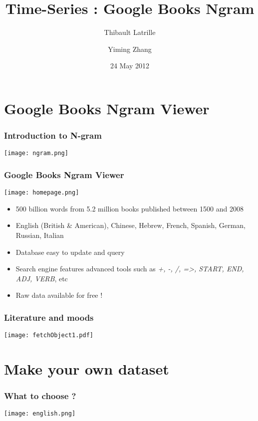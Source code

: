 \documentclass[10pt]{beamer}
\author{ Thibault Latrille \and Yiming Zhang}
\title{Time-Series : Google Books Ngram }
\institute{Uppsala Universitet, Mathematics department}
\date{24 May 2012}
\begin{document}
\lstset{language=Python,tabsize=2}
\frame{\titlepage} 

\section{Google Books Ngram Viewer}


\begin{frame}
\frametitle{Introduction to N-gram}
	\begin{center}
       \texttt{[image: ngram.png]}
	\end{center}
\end{frame}

\begin{frame}
\frametitle{Google Books Ngram Viewer}
	\begin{center}
       \texttt{[image: homepage.png]}
	\end{center}

\begin{itemize}
\item 500 billion words from 5.2 million books published between 1500 and 2008  
\item English (British \& American), Chinese, Hebrew, French, Spanish, German, Russian, Italian
\item Database easy to update and query
\item Search engine features advanced tools such as \emph{+, -, /, =>, START, END, ADJ, VERB}, etc
\item Raw data available for free !
\end{itemize}
\end{frame}

\begin{frame}
\frametitle{Literature and moods}
	\begin{center}
       \texttt{[image: fetchObject1.pdf]}
	\end{center}
\end{frame}

\section{Make your own dataset}

\begin{frame}
\frametitle{What to choose ?}
	\begin{center}
       \texttt{[image: english.png]}
	\end{center}
\end{frame}
\end{document}
